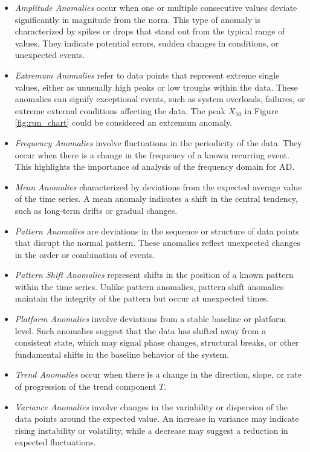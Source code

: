 \begin{itemize}
    \item \textit{Amplitude Anomalies} occur when one or multiple consecutive values deviate significantly in magnitude from the norm. This type of anomaly is characterized by spikes or drops that stand out from the typical range of values. They indicate potential errors, sudden changes in conditions, or unexpected events.

    \item \textit{Extremum Anomalies} refer to data points that represent extreme single values, either as unusually high peaks or low troughs within the data. These anomalies can signify exceptional events, such as system overloads, failures, or extreme external conditions affecting the data. The peak $X_50$ in Figure \ref{fig:run_chart} could be considered an extremum anomaly.

    \item \textit{Frequency Anomalies} involve fluctuations in the periodicity of the data. They occur when there is a change in the frequency of a known recurring event. This highlights the importance of analysis of the frequency domain for AD.

    \item \textit{Mean Anomalies} characterized by deviations from the expected average value of the time series. A mean anomaly indicates a shift in the central tendency, such as long-term drifts or gradual changes.

    \item \textit{Pattern Anomalies} are deviations in the sequence or structure of data points that disrupt the normal pattern. These anomalies reflect unexpected changes in the order or combination of events.

    \item \textit{Pattern Shift Anomalies} represent shifts in the position of a known pattern within the time series. Unlike pattern anomalies, pattern shift anomalies maintain the integrity of the pattern but occur at unexpected times.

    \item \textit{Platform Anomalies} involve deviations from a stable baseline or platform level. Such anomalies suggest that the data has shifted away from a consistent state, which may signal phase changes, structural breaks, or other fundamental shifts in the baseline behavior of the system.

    \item \textit{Trend Anomalies} occur when there is a change in the direction, slope, or rate of progression of the trend component $T$.

    \item \textit{Variance Anomalies} involve changes in the variability or dispersion of the data points around the expected value. An increase in variance may indicate rising instability or volatility, while a decrease may suggest a reduction in expected fluctuations.
\end{itemize}

